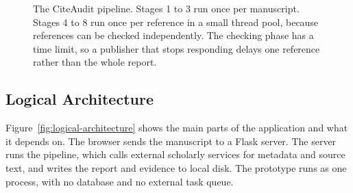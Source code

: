 \documentclass{article}
\begin{document}
\begin{figure}[htbp]

\caption{
The CiteAudit pipeline. Stages 1 to 3 run once per manuscript. Stages 4 to 8 run once per reference in a small thread pool, because references can be checked independently. The checking phase has a time limit, so a publisher that stops responding delays one reference rather than the whole report.
}

\label{fig:pipeline}
\end{figure}

\subsection{Logical Architecture}

Figure~\ref{fig:logical-architecture} shows the main parts of the application and what it depends on. The browser sends the manuscript to a Flask server. The server runs the pipeline, which calls external scholarly services for metadata and source text, and writes the report and evidence to local disk. The prototype runs as one process, with no database and no external task queue.
\end{document}
